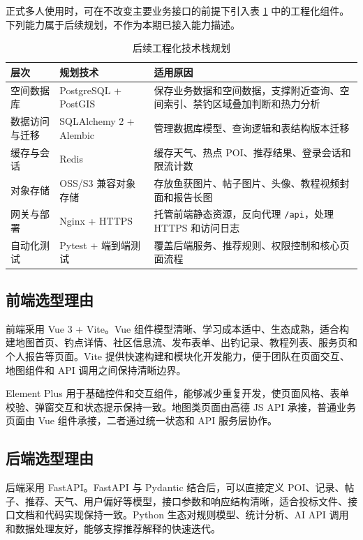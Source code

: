 正式多人使用时，可在不改变主要业务接口的前提下引入表 \ref{tab:future-tech-stack} 中的工程化组件。下列能力属于后续规划，不作为本期已接入能力描述。

\begin{table}[H]
  \centering
  \caption{后续工程化技术栈规划}
  \label{tab:future-tech-stack}
  \begin{tabularx}{\textwidth}{p{3cm}|p{4.6cm}|X}
    \toprule
    \textbf{层次} & \textbf{规划技术} & \textbf{适用原因} \\
    \midrule
    空间数据库 & PostgreSQL + PostGIS & 保存业务数据和空间数据，支撑附近查询、空间索引、禁钓区域叠加判断和热力分析 \\
    \hline
    数据访问与迁移 & SQLAlchemy 2 + Alembic & 管理数据库模型、查询逻辑和表结构版本迁移 \\
    \hline
    缓存与会话 & Redis & 缓存天气、热点 POI、推荐结果、登录会话和限流计数 \\
    \hline
    对象存储 & OSS/S3 兼容对象存储 & 存放鱼获图片、帖子图片、头像、教程视频封面和报告长图 \\
    \hline
    网关与部署 & Nginx + HTTPS & 托管前端静态资源，反向代理 \texttt{/api}，处理 HTTPS 和访问日志 \\
    \hline
    自动化测试 & Pytest + 端到端测试 & 覆盖后端服务、推荐规则、权限控制和核心页面流程 \\
    \bottomrule
  \end{tabularx}
\end{table}

\subsection{前端选型理由}

前端采用 Vue 3 + Vite。Vue 组件模型清晰、学习成本适中、生态成熟，适合构建地图首页、钓点详情、社区信息流、发布表单、出钓记录、教程列表、服务页和个人报告等页面。Vite 提供快速构建和模块化开发能力，便于团队在页面交互、地图组件和 API 调用之间保持清晰边界。

Element Plus 用于基础控件和交互组件，能够减少重复开发，使页面风格、表单校验、弹窗交互和状态提示保持一致。地图类页面由高德 JS API 承接，普通业务页面由 Vue 组件承接，二者通过统一状态和 API 服务层协作。

\subsection{后端选型理由}

后端采用 FastAPI。FastAPI 与 Pydantic 结合后，可以直接定义 POI、记录、帖子、推荐、天气、用户偏好等模型，接口参数和响应结构清晰，适合投标文件、接口文档和代码实现保持一致。Python 生态对规则模型、统计分析、AI API 调用和数据处理友好，能够支撑推荐解释的快速迭代。

